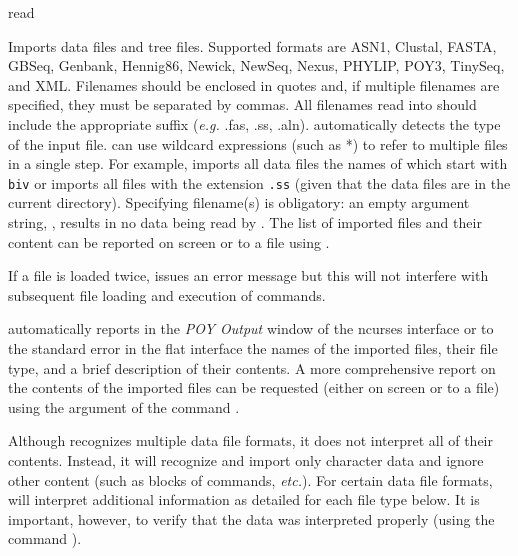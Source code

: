 \begin{command}{read}{}


	\begin{poydescription} 
        Imports data files and tree files.  Supported formats are ASN1, Clustal, FASTA,
        GBSeq, Genbank, Hennig86, Newick, NewSeq, Nexus, PHYLIP, POY3,
        TinySeq, and XML. Filenames should be enclosed in quotes and, if multiple
        filenames are specified, they must be separated by commas. 
        All filenames read into \poy should include the appropriate suffix (\emph{e.g.} .fas, .ss, .aln).
         automatically detects the type of the input file. 
         can use wildcard expressions (such as *) to
        refer to multiple files in a single step. For example,  
        imports all data files the names of which start
        with \texttt{biv} or  imports all files with
        the extension \texttt{.ss} (given that the data files are in the current directory).
        Specifying filename(s) is
        obligatory: an empty argument string, , results in no
        data being read by \poy. The list of imported files and their content
        can be reported on screen or to a file using .
        
        If a file is loaded twice, \poy issues an error message but this will not
        interfere with subsequent file loading and execution of commands.
        
       \poy automatically reports in the \emph{POY Output} window of the ncurses
            interface or to the standard error in the flat interface the names
            of the imported files, their file type, and a brief description of
            their contents. A more comprehensive report on the contents of the imported
            files can be requested (either on screen or to a file) using the argument
             of the command .

        \begin{statement}
            Although \poy recognizes multiple data file formats, it does not
            interpret all of their contents. Instead, it will recognize and import
            only character data and ignore other content (such as blocks of
            commands, \emph{etc.}). For certain data file formats, \poy will interpret
            additional information as detailed for each file type below.
            It is important, however, to verify that the data was interpreted properly (using
            the command ).
            

\end{statement}
\end{poydescription}
\end{command}
